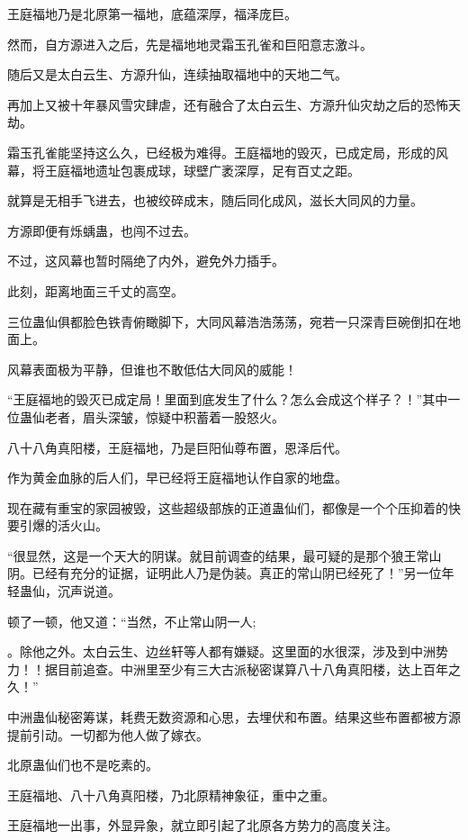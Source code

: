 
\begin{this_body}

王庭福地乃是北原第一福地，底蕴深厚，福泽庞巨。

然而，自方源进入之后，先是福地地灵霜玉孔雀和巨阳意志激斗。

随后又是太白云生、方源升仙，连续抽取福地中的天地二气。

再加上又被十年暴风雪灾肆虐，还有融合了太白云生、方源升仙灾劫之后的恐怖天劫。

霜玉孔雀能坚持这么久，已经极为难得。王庭福地的毁灭，已成定局，形成的风幕，将王庭福地遗址包裹成球，球壁广袤深厚，足有百丈之距。

就算是无相手飞进去，也被绞碎成末，随后同化成风，滋长大同风的力量。

方源即便有烁蝺蛊，也闯不过去。

不过，这风幕也暂时隔绝了内外，避免外力插手。

此刻，距离地面三千丈的高空。

三位蛊仙俱都脸色铁青俯瞰脚下，大同风幕浩浩荡荡，宛若一只深青巨碗倒扣在地面上。

风幕表面极为平静，但谁也不敢低估大同风的威能！

“王庭福地的毁灭已成定局！里面到底发生了什么？怎么会成这个样子？！”其中一位蛊仙老者，眉头深皱，惊疑中积蓄着一股怒火。

八十八角真阳楼，王庭福地，乃是巨阳仙尊布置，恩泽后代。

作为黄金血脉的后人们，早已经将王庭福地认作自家的地盘。

现在藏有重宝的家园被毁，这些超级部族的正道蛊仙们，都像是一个个压抑着的快要引爆的活火山。

“很显然，这是一个天大的阴谋。就目前调查的结果，最可疑的是那个狼王常山阴。已经有充分的证据，证明此人乃是伪装。真正的常山阴已经死了！”另一位年轻蛊仙，沉声说道。

顿了一顿，他又道：“当然，不止常山阴一人;

。除他之外。太白云生、边丝轩等人都有嫌疑。这里面的水很深，涉及到中洲势力！！据目前追查。中洲里至少有三大古派秘密谋算八十八角真阳楼，达上百年之久！”

中洲蛊仙秘密筹谋，耗费无数资源和心思，去埋伏和布置。结果这些布置都被方源提前引动。一切都为他人做了嫁衣。

北原蛊仙们也不是吃素的。

王庭福地、八十八角真阳楼，乃北原精神象征，重中之重。

王庭福地一出事，外显异象，就立即引起了北原各方势力的高度关注。


\end{this_body}
